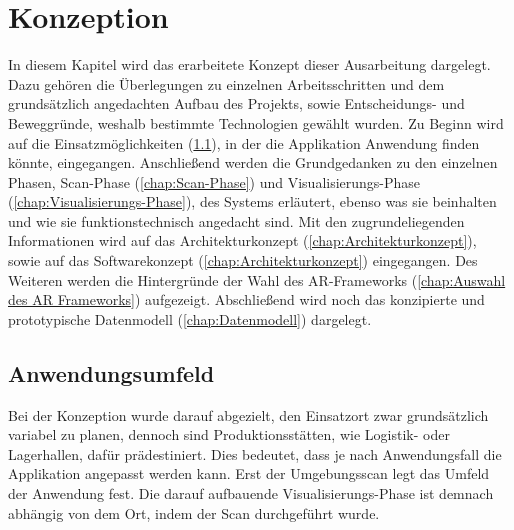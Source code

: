 \chapter{Konzeption}
\label{chap:Konzeption}
In diesem Kapitel wird das erarbeitete Konzept dieser Ausarbeitung dargelegt. Dazu gehören die Überlegungen zu einzelnen 
Arbeitsschritten und dem grundsätzlich angedachten Aufbau des Projekts, sowie Entscheidungs- und Beweggründe, weshalb bestimmte 
Technologien gewählt wurden. Zu Beginn wird auf die Einsatzmöglichkeiten (\ref{chap:Arbeitsumgebung}), in der die Applikation Anwendung 
finden könnte, eingegangen. Anschließend werden die Grundgedanken zu den einzelnen Phasen, Scan-Phase (\ref{chap:Scan-Phase}) und 
Visualisierungs-Phase (\ref{chap:Visualisierungs-Phase}), des Systems erläutert, ebenso was sie beinhalten und wie sie funktionstechnisch 
angedacht sind. Mit den zugrundeliegenden Informationen wird auf das Architekturkonzept (\ref{chap:Architekturkonzept}), sowie auf das 
Softwarekonzept (\ref{chap:Architekturkonzept}) eingegangen. Des Weiteren werden die Hintergründe der Wahl des AR-Frameworks 
(\ref{chap:Auswahl des AR Frameworks}) aufgezeigt. Abschließend wird noch das konzipierte und prototypische Datenmodell 
(\ref{chap:Datenmodell}) dargelegt.

\section{Anwendungsumfeld}
\label{chap:Arbeitsumgebung}
Bei der Konzeption wurde darauf abgezielt, den Einsatzort zwar grundsätzlich variabel zu planen, dennoch sind %
Produktionsstätten, wie Logistik- oder Lagerhallen, dafür prädestiniert. 
Dies bedeutet, dass je nach Anwendungsfall die Applikation angepasst werden kann. Erst der Umgebungsscan legt das Umfeld der Anwendung fest. %
Die darauf aufbauende 
Visualisierungs-Phase ist demnach abhängig von dem Ort, indem der Scan durchgeführt wurde. %
